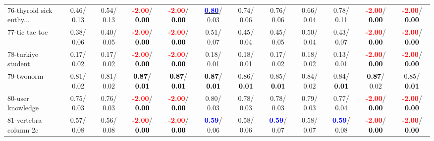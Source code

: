 \begin{table}[h]
\begin{center}
{\begin{tabular}{lc|c|c|c|c|c|c|c|c|c|c}
76-thyroid sick euthy... &   0.46/  0.13 &   0.54/  0.13 & \textcolor{red}{\textbf{ -2.00}}/\textcolor{black}{\textbf{  0.00}} & \textcolor{red}{\textbf{ -2.00}}/\textcolor{black}{\textbf{  0.00}} & \underline{\textcolor{blue}{\textbf{  0.80}}}/  0.03 &   0.74/  0.06 &   0.76/  0.06 &   0.66/  0.04 &   0.78/  0.11 & \textcolor{red}{\textbf{ -2.00}}/\textcolor{black}{\textbf{  0.00}} & \textcolor{red}{\textbf{ -2.00}}/\textcolor{black}{\textbf{  0.00}} \\
77-tic tac toe &   0.38/  0.06 &   0.40/  0.05 & \textcolor{red}{\textbf{ -2.00}}/\textcolor{black}{\textbf{  0.00}} & \textcolor{red}{\textbf{ -2.00}}/\textcolor{black}{\textbf{  0.00}} &   0.51/  0.07 &   0.45/  0.04 &   0.45/  0.05 &   0.50/  0.04 &   0.43/  0.07 & \textcolor{red}{\textbf{ -2.00}}/\textcolor{black}{\textbf{  0.00}} & \textcolor{red}{\textbf{ -2.00}}/\textcolor{black}{\textbf{  0.00}} \\
78-turkiye student &   0.17/  0.02 &   0.17/  0.02 & \textcolor{red}{\textbf{ -2.00}}/\textcolor{black}{\textbf{  0.00}} & \textcolor{red}{\textbf{ -2.00}}/\textcolor{black}{\textbf{  0.00}} &   0.18/  0.01 &   0.18/  0.01 &   0.17/  0.02 &   0.18/  0.02 &   0.13/  0.01 & \textcolor{red}{\textbf{ -2.00}}/\textcolor{black}{\textbf{  0.00}} & \textcolor{red}{\textbf{ -2.00}}/\textcolor{black}{\textbf{  0.00}} \\ \hline
79-twonorm &   0.81/  0.02 &   0.81/  0.02 & \textcolor{black}{\textbf{  0.87}}/\textcolor{black}{\textbf{  0.01}} & \textcolor{black}{\textbf{  0.87}}/\textcolor{black}{\textbf{  0.01}} & \textcolor{black}{\textbf{  0.87}}/\textcolor{black}{\textbf{  0.01}} &   0.86/\textcolor{black}{\textbf{  0.01}} &   0.85/\textcolor{black}{\textbf{  0.01}} &   0.84/  0.02 &   0.84/\textcolor{black}{\textbf{  0.01}} & \textcolor{black}{\textbf{  0.87}}/  0.02 &   0.85/\textcolor{black}{\textbf{  0.01}} \\
80-user knowledge &   0.75/  0.03 &   0.76/  0.03 & \textcolor{red}{\textbf{ -2.00}}/\textcolor{black}{\textbf{  0.00}} & \textcolor{red}{\textbf{ -2.00}}/\textcolor{black}{\textbf{  0.00}} &   0.80/  0.03 &   0.78/  0.03 &   0.78/  0.03 &   0.79/  0.03 &   0.77/  0.04 & \textcolor{red}{\textbf{ -2.00}}/\textcolor{black}{\textbf{  0.00}} & \textcolor{red}{\textbf{ -2.00}}/\textcolor{black}{\textbf{  0.00}} \\
81-vertebra column 2c &   0.57/  0.08 &   0.56/  0.08 & \textcolor{red}{\textbf{ -2.00}}/\textcolor{black}{\textbf{  0.00}} & \textcolor{red}{\textbf{ -2.00}}/\textcolor{black}{\textbf{  0.00}} & \textcolor{blue}{\textbf{  0.59}}/  0.06 &   0.58/  0.06 & \textcolor{blue}{\textbf{  0.59}}/  0.07 &   0.58/  0.07 & \textcolor{blue}{\textbf{  0.59}}/  0.08 & \textcolor{red}{\textbf{ -2.00}}/\textcolor{black}{\textbf{  0.00}} & \textcolor{red}{\textbf{ -2.00}}/\textcolor{black}{\textbf{  0.00}} \\

\end{tabular}}
\end{center}
\end{table}

